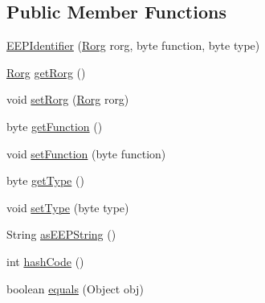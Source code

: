 \subsection*{Public Member Functions}
\begin{DoxyCompactItemize}
\item 
\hyperlink{classit_1_1polito_1_1elite_1_1enocean_1_1enj_1_1eep_1_1_e_e_p_identifier_ad3e85d7b90baf171d99bc0442a4b7c65}{E\+E\+P\+Identifier} (\hyperlink{classit_1_1polito_1_1elite_1_1enocean_1_1enj_1_1eep_1_1_rorg}{Rorg} rorg, byte function, byte type)
\item 
\hyperlink{classit_1_1polito_1_1elite_1_1enocean_1_1enj_1_1eep_1_1_rorg}{Rorg} \hyperlink{classit_1_1polito_1_1elite_1_1enocean_1_1enj_1_1eep_1_1_e_e_p_identifier_aee9d7138907c4bbbbd38e94f46eca7b9}{get\+Rorg} ()
\item 
void \hyperlink{classit_1_1polito_1_1elite_1_1enocean_1_1enj_1_1eep_1_1_e_e_p_identifier_a473abce21a7d78057d09db8731a8e95e}{set\+Rorg} (\hyperlink{classit_1_1polito_1_1elite_1_1enocean_1_1enj_1_1eep_1_1_rorg}{Rorg} rorg)
\item 
byte \hyperlink{classit_1_1polito_1_1elite_1_1enocean_1_1enj_1_1eep_1_1_e_e_p_identifier_aae8eb9ceaf4013ceed57c4e6d651387c}{get\+Function} ()
\item 
void \hyperlink{classit_1_1polito_1_1elite_1_1enocean_1_1enj_1_1eep_1_1_e_e_p_identifier_a2e0afd38aa1717e084ac8fb01758878b}{set\+Function} (byte function)
\item 
byte \hyperlink{classit_1_1polito_1_1elite_1_1enocean_1_1enj_1_1eep_1_1_e_e_p_identifier_a5d01e53501bc8de5ec5cf00ea37bde4a}{get\+Type} ()
\item 
void \hyperlink{classit_1_1polito_1_1elite_1_1enocean_1_1enj_1_1eep_1_1_e_e_p_identifier_ab2f8ea97578573c6a543dc9ab04c5f34}{set\+Type} (byte type)
\item 
String \hyperlink{classit_1_1polito_1_1elite_1_1enocean_1_1enj_1_1eep_1_1_e_e_p_identifier_a264d81c801a2c22393e88883353d2dad}{as\+E\+E\+P\+String} ()
\item 
int \hyperlink{classit_1_1polito_1_1elite_1_1enocean_1_1enj_1_1eep_1_1_e_e_p_identifier_a5eebfa0ec5c98e1fafd0cf6be20de243}{hash\+Code} ()
\item 
boolean \hyperlink{classit_1_1polito_1_1elite_1_1enocean_1_1enj_1_1eep_1_1_e_e_p_identifier_a153627cd9e9aee776a50330d6dcd4b3a}{equals} (Object obj)
\end{DoxyCompactItemize}
